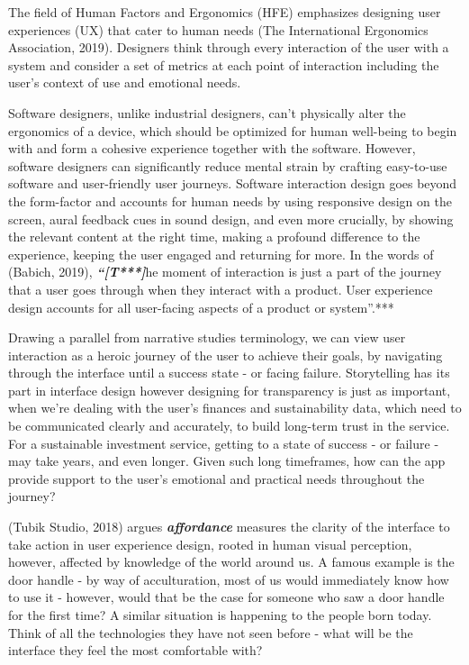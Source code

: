 \documentclass[
  letterpaper,
  DIV=11,
  numbers=noendperiod]{scrartcl}
\begin{document}
The field of Human Factors and Ergonomics (HFE) emphasizes designing
user experiences (UX) that cater to human needs (The International
Ergonomics Association, 2019). Designers think through every interaction
of the user with a system and consider a set of metrics at each point of
interaction including the user's context of use and emotional needs.

Software designers, unlike industrial designers, can't physically alter
the ergonomics of a device, which should be optimized for human
well-being to begin with and form a cohesive experience together with
the software. However, software designers can significantly reduce
mental strain by crafting easy-to-use software and user-friendly user
journeys. Software interaction design goes beyond the form-factor and
accounts for human needs by using responsive design on the screen, aural
feedback cues in sound design, and even more crucially, by showing the
relevant content at the right time, making a profound difference to the
experience, keeping the user engaged and returning for more. In the
words of (Babich, 2019), \textbf{\emph{``{[}T***{]}}}he moment of
interaction is just a part of the journey that a user goes through when
they interact with a product. User experience design accounts for all
user-facing aspects of a product or system''.***

Drawing a parallel from narrative studies terminology, we can view user
interaction as a heroic journey of the user to achieve their goals, by
navigating through the interface until a success state - or facing
failure. Storytelling has its part in interface design however designing
for transparency is just as important, when we're dealing with the
user's finances and sustainability data, which need to be communicated
clearly and accurately, to build long-term trust in the service. For a
sustainable investment service, getting to a state of success - or
failure - may take years, and even longer. Given such long timeframes,
how can the app provide support to the user's emotional and practical
needs throughout the journey?

(Tubik Studio, 2018) argues \textbf{\emph{affordance}} measures the
clarity of the interface to take action in user experience design,
rooted in human visual perception, however, affected by knowledge of the
world around us. A famous example is the door handle - by way of
acculturation, most of us would immediately know how to use it -
however, would that be the case for someone who saw a door handle for
the first time? A similar situation is happening to the people born
today. Think of all the technologies they have not seen before - what
will be the interface they feel the most comfortable with?
\end{document}
